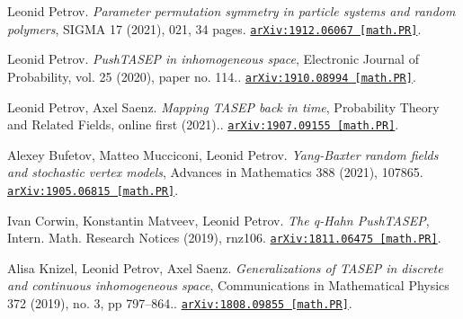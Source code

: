 \begin{etaremune}
\item 
Leonid Petrov.
\emph{Parameter permutation symmetry in particle systems and random polymers}, SIGMA 17 (2021), 021, 34 pages. 
\href{https://arxiv.org/abs/1912.06067}{\texttt{arXiv:1912.06067 [math.PR]}}.



\item 
Leonid Petrov.
\emph{PushTASEP in inhomogeneous space}, Electronic Journal of Probability, vol. 25 (2020), paper no. 114.. 
\href{https://arxiv.org/abs/1910.08994}{\texttt{arXiv:1910.08994 [math.PR]}}.









\item 
Leonid Petrov, Axel Saenz.
\emph{Mapping TASEP back in time}, Probability Theory and Related Fields, online first (2021).. 
\href{https://arxiv.org/abs/1907.09155}{\texttt{arXiv:1907.09155 [math.PR]}}.







\item 
Alexey Bufetov, Matteo Mucciconi, Leonid Petrov.
\emph{Yang-Baxter random fields and stochastic vertex models}, Advances in Mathematics 388 (2021), 107865. 
\href{https://arxiv.org/abs/1905.06815}{\texttt{arXiv:1905.06815 [math.PR]}}.















\item 
Ivan Corwin, Konstantin Matveev, Leonid Petrov.
\emph{The q-Hahn PushTASEP}, Intern. Math. Research Notices (2019),  rnz106. 
\href{https://arxiv.org/abs/1811.06475}{\texttt{arXiv:1811.06475 [math.PR]}}.





\item 
Alisa Knizel, Leonid Petrov, Axel Saenz.
\emph{Generalizations of TASEP in discrete and continuous inhomogeneous space}, Communications in Mathematical Physics 372 (2019), no. 3, pp 797–864.. 
\href{https://arxiv.org/abs/1808.09855}{\texttt{arXiv:1808.09855 [math.PR]}}.












\end{etaremune}
